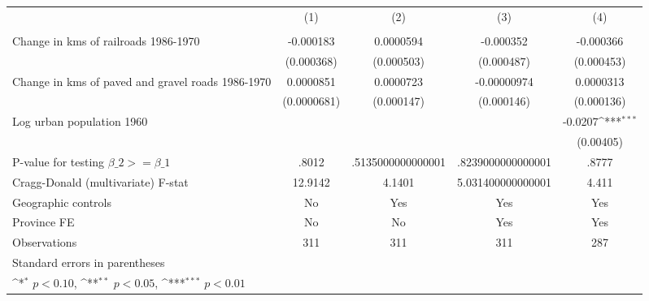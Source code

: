 {
\def\sym#1{\ifmmode^{#1}\else\(^{#1}\)\fi}
\begin{tabular}{l*{4}{c}}
\hline\hline
                &\multicolumn{1}{c}{(1)}&\multicolumn{1}{c}{(2)}&\multicolumn{1}{c}{(3)}&\multicolumn{1}{c}{(4)}\\
                &\multicolumn{1}{c}{}&\multicolumn{1}{c}{}&\multicolumn{1}{c}{}&\multicolumn{1}{c}{}\\
\hline
Change in kms of railroads 1986-1970&-0.000183         &0.0000594         &-0.000352         &-0.000366         \\
                &(0.000368)         &(0.000503)         &(0.000487)         &(0.000453)         \\
[1em]
Change in kms of paved and gravel roads 1986-1970&0.0000851         &0.0000723         &-0.00000974         &0.0000313         \\
                &(0.0000681)         &(0.000147)         &(0.000146)         &(0.000136)         \\
[1em]
Log urban population 1960&                  &                  &                  &  -0.0207\sym{***}\\
                &                  &                  &                  &(0.00405)         \\
\hline
P-value for testing $\beta\_{2} >= \beta\_{1}$&    .8012         &.5135000000000001         &.8239000000000001         &    .8777         \\
Cragg-Donald (multivariate) F-stat&  12.9142         &   4.1401         &5.031400000000001         &    4.411         \\
Geographic controls&       No         &      Yes         &      Yes         &      Yes         \\
Province FE     &       No         &       No         &      Yes         &      Yes         \\
Observations    &      311         &      311         &      311         &      287         \\
\hline\hline
\multicolumn{5}{l}{\footnotesize Standard errors in parentheses}\\
\multicolumn{5}{l}{\footnotesize \sym{*} \(p<0.10\), \sym{**} \(p<0.05\), \sym{***} \(p<0.01\)}\\
\end{tabular}
}
